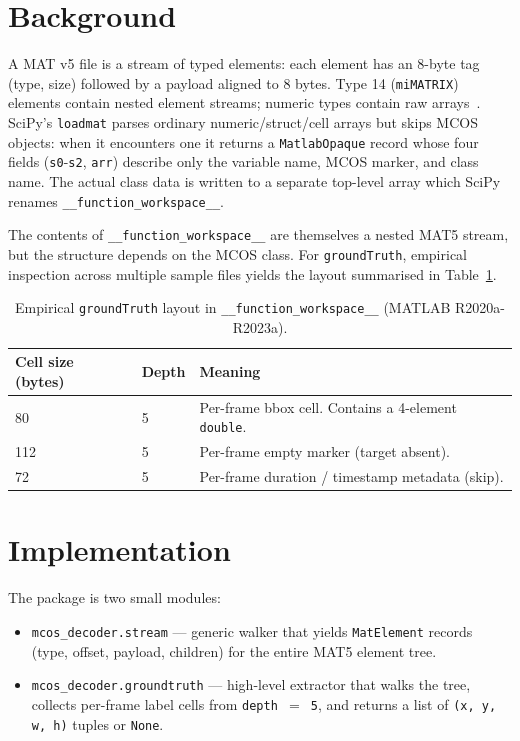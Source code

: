 \documentclass[10pt]{article}
\begin{document}
\section{Background}

A MAT v5 file is a stream of typed elements: each element has an 8-byte
tag (type, size) followed by a payload aligned to 8 bytes. Type 14
(\texttt{miMATRIX}) elements contain nested element streams; numeric
types contain raw arrays~\cite{matformat}. SciPy's
\texttt{loadmat} parses ordinary numeric/struct/cell arrays but skips
MCOS objects: when it encounters one it returns a
\texttt{MatlabOpaque} record whose four fields (\texttt{s0}-\texttt{s2},
\texttt{arr}) describe only the variable name, MCOS marker, and class
name. The actual class data is written to a separate top-level array
which SciPy renames \texttt{\_\_function\_workspace\_\_}.

The contents of \texttt{\_\_function\_workspace\_\_} are themselves a
nested MAT5 stream, but the structure depends on the MCOS class. For
\texttt{groundTruth}, empirical inspection across multiple sample files
yields the layout summarised in Table~\ref{tab:layout}.

\begin{table}[h]
\centering
\caption{Empirical \texttt{groundTruth} layout in
\texttt{\_\_function\_workspace\_\_} (MATLAB R2020a-R2023a).}
\label{tab:layout}
\begin{tabular}{lll}
\toprule
Cell size (bytes) & Depth & Meaning \\
\midrule
80   & 5 & Per-frame bbox cell. Contains a 4-element \texttt{double}. \\
112  & 5 & Per-frame empty marker (target absent). \\
72   & 5 & Per-frame duration / timestamp metadata (skip). \\
\bottomrule
\end{tabular}
\end{table}

\section{Implementation}

The package is two small modules:

\begin{itemize}
  \item \texttt{mcos\_decoder.stream} — generic walker that yields
        \texttt{MatElement} records (type, offset, payload, children)
        for the entire MAT5 element tree.
  \item \texttt{mcos\_decoder.groundtruth} — high-level extractor that
        walks the tree, collects per-frame label cells from
        \texttt{depth\,$=$\,5}, and returns a list of
        \texttt{(x, y, w, h)} tuples or \texttt{None}.
\end{itemize}
\end{document}
